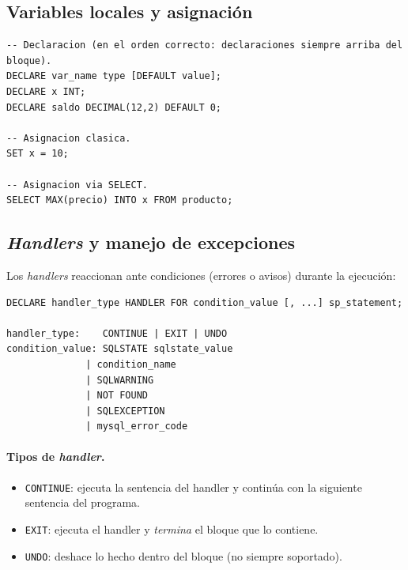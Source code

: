 \documentclass[11pt,a4paper]{article}
\begin{document}
\subsection{Variables locales y asignación}

\begin{lstlisting}
-- Declaracion (en el orden correcto: declaraciones siempre arriba del bloque).
DECLARE var_name type [DEFAULT value];
DECLARE x INT;
DECLARE saldo DECIMAL(12,2) DEFAULT 0;

-- Asignacion clasica.
SET x = 10;

-- Asignacion via SELECT.
SELECT MAX(precio) INTO x FROM producto;
\end{lstlisting}

\subsection{\emph{Handlers} y manejo de excepciones}

Los \emph{handlers} reaccionan ante condiciones (errores o avisos)
durante la ejecución:

\begin{lstlisting}
DECLARE handler_type HANDLER FOR condition_value [, ...] sp_statement;

handler_type:    CONTINUE | EXIT | UNDO
condition_value: SQLSTATE sqlstate_value
              | condition_name
              | SQLWARNING
              | NOT FOUND
              | SQLEXCEPTION
              | mysql_error_code
\end{lstlisting}

\paragraph{Tipos de \emph{handler}.}

\begin{itemize}
    \item \texttt{CONTINUE}: ejecuta la sentencia del handler y
    continúa con la siguiente sentencia del programa.
    \item \texttt{EXIT}: ejecuta el handler y \emph{termina} el
    bloque que lo contiene.
    \item \texttt{UNDO}: deshace lo hecho dentro del bloque (no
    siempre soportado).
\end{itemize}
\end{document}
